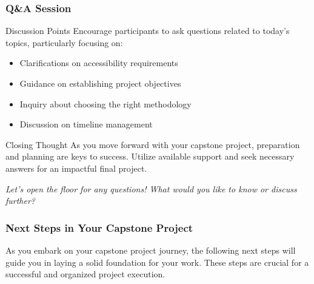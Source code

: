 \documentclass[aspectratio=169]{beamer}
\begin{document}
\begin{frame}[fragile]
    \frametitle{Q\&A Session}
    \begin{block}{Discussion Points}
        Encourage participants to ask questions related to today's topics, particularly focusing on:
        \begin{itemize}
            \item Clarifications on accessibility requirements
            \item Guidance on establishing project objectives
            \item Inquiry about choosing the right methodology
            \item Discussion on timeline management
        \end{itemize}
    \end{block}
    
    \begin{block}{Closing Thought}
        As you move forward with your capstone project, preparation and planning are keys to success. Utilize available support and seek necessary answers for an impactful final project.
    \end{block}
    
    \begin{center}
        \textit{Let's open the floor for any questions! What would you like to know or discuss further?}
    \end{center}
\end{frame}

\begin{frame}[fragile]
    \frametitle{Next Steps in Your Capstone Project}
    As you embark on your capstone project journey, the following next steps will guide you in laying a solid foundation for your work. These steps are crucial for a successful and organized project execution.
\end{frame}
\end{document}
